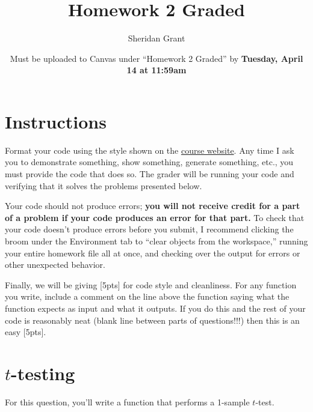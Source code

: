 \documentclass[12pt]{article}
\title{Homework 2 Graded}
\author{Sheridan Grant}
\date{Must be uploaded to Canvas under ``Homework 2 Graded'' by \textbf{Tuesday, April 14 at 11:59am}}
\begin{document}
\sloppy

\maketitle

\section*{Instructions}

Format your code using the style shown on the \href{https://sheridanlgrant.github.io/teaching/STAT302_SPR2020}{course website}. Any time I ask you to demonstrate something, show something, generate something, etc., you must provide the code that does so. The grader will be running your code and verifying that it solves the problems presented below.

Your code should not produce errors; \textbf{you will not receive credit for a part of a problem if your code produces an error for that part.} To check that your code doesn't produce errors before you submit, I recommend clicking the broom under the Environment tab to ``clear objects from the workspace,'' running your entire homework file all at once, and checking over the output for errors or other unexpected behavior.

Finally, we will be giving [5pts] for code style and cleanliness. For any function you write, include a comment on the line above the function saying what the function expects as input and what it outputs. If you do this and the rest of your code is reasonably neat (blank line between parts of questions!!!) then this is an easy [5pts].

\section{$t$-testing}

For this question, you'll write a function that performs a 1-sample $t$-test.
\end{document}
